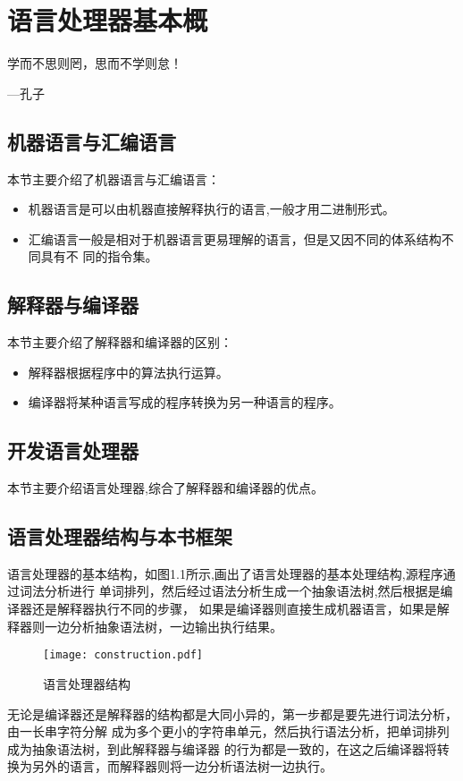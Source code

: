 \chapter{语言处理器基本概}

\begin{center}
学而不思则罔，思而不学则怠！
\end{center}

\begin{flushright}
---孔子    
\end{flushright}

\section{机器语言与汇编语言}
本节主要介绍了机器语言与汇编语言：
\begin{itemize}
    \item 机器语言是可以由机器直接解释执行的语言,一般才用二进制形式\cite{complete}。
    \item 汇编语言一般是相对于机器语言更易理解的语言，但是又因不同的体系结构不同具有不
    同的指令集。
\end{itemize} 


\section{解释器与编译器}
本节主要介绍了解释器和编译器的区别：
\begin{itemize}
    \item 解释器根据程序中的算法执行运算。
    \item 编译器将某种语言写成的程序转换为另一种语言的程序。
\end{itemize}    
    
\section{开发语言处理器}
本节主要介绍语言处理器,综合了解释器和编译器的优点。

\section{语言处理器结构与本书框架}
语言处理器的基本结构，如图1.1所示,画出了语言处理器的基本处理结构,源程序通过词法分析进行
单词排列，然后经过语法分析生成一个抽象语法树,然后根据是编译器还是解释器执行不同的步骤，
如果是编译器则直接生成机器语言，如果是解释器则一边分析抽象语法树，一边输出执行结果。
\begin{figure}[hbtp]
\centering
\texttt{[image: construction.pdf]}
\caption{语言处理器结构}
\end{figure}


无论是编译器还是解释器的结构都是大同小异的，第一步都是要先进行词法分析，由一长串字符分解
成为多个更小的字符串单元，然后执行语法分析，把单词排列成为抽象语法树，到此解释器与编译器
的行为都是一致的，在这之后编译器将转换为另外的语言，而解释器则将一边分析语法树一边执行。